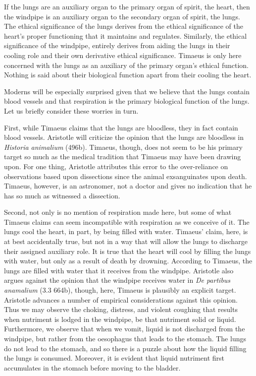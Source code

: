 If the lungs are an auxiliary organ to the primary organ of spirit, the heart, then the windpipe is an auxiliary organ to the secondary organ of spirit, the lungs. The ethical significance of the lungs derives from the ethical significance of the heart's proper functioning that it maintains and regulates. Similarly, the ethical significance of the windpipe, entirely derives from aiding the lungs in their cooling role and their own derivative ethical significance. Timaeus is only here concerned with the lungs as an auxiliary of the primary organ's ethical function. Nothing is said about their biological function apart from their cooling the heart. 

Moderns will be especially surprised given that we believe that the lungs contain blood vessels and that respiration is the primary biological function of the lungs. Let us briefly consider these worries in turn. 

First, while Timaeus claims that the lungs are bloodless, they in fact contain blood vessels. Aristotle will criticize the opinion that the lungs are bloodless in \emph{Historia animalium} (496b). Timaeus, though, does not seem to be his primary target so much as the medical tradition that Timaeus may have been drawing upon. For one thing, Aristotle attributes this error to the over-reliance on observations based upon dissections since the animal exsanguinates upon death. Timaeus, however, is an astronomer, not a doctor and gives no indication that he has so much as witnessed a dissection. 

Second, not only is no mention of respiration made here, but some of what Timaeus claims can seem incompatible with respiration as we conceive of it. The lungs cool the heart, in part, by being filled with water. Timaeus' claim, here, is at best accidentally true, but not in a way that will allow the lungs to discharge their assigned auxiliary role. It is true that the heart will cool by filling the lungs with water, but only as a result of death by drowning. According to Timaeus, the lungs are filled with water that it receives from the windpipe. Aristotle also argues against the opinion that the windpipe receives water in \emph{De partibus anamalium} (3.3 664b), though, here, Timaeus is plausibly an explicit target. Aristotle advances a number of empirical considerations against this opinion. Thus we may observe the choking, distress, and violent coughing that results when nutriment is lodged in the windpipe, be that nutriment solid or liquid. Furthermore, we observe that when we vomit, liquid is not discharged from the windpipe, but rather from the oesophagus that leads to the stomach. The lungs do not lead to the stomach, and so there is a puzzle about how the liquid filling the lungs is consumed. Moreover, it is evident that liquid nutriment first accumulates in the stomach before moving to the bladder.


